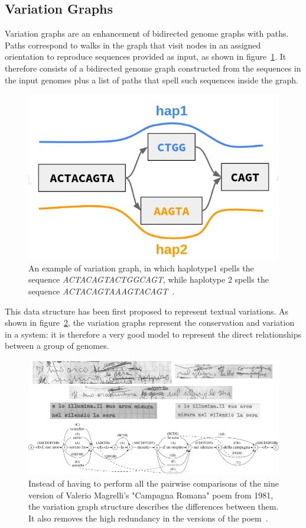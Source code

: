 \subsection{Variation Graphs}
Variation graphs are an enhancement of bidirected genome graphs with paths. Paths correspond to walks in the graph that visit nodes in an assigned orientation to reproduce sequences provided as input, as shown in figure~\ref{fig:vg_example}. It therefore consists of a bidirected genome graph constructed from the sequences in the input genomes plus a list of paths that spell such sequences inside the graph.
\begin{figure}[h!]
	\centering
	\includegraphics[width=.65\linewidth]{figures/background/vg.png}
	\caption[The Variation Graph model.]{An example of variation graph, in which haplotype1 spells the sequence \emph{ACTACAGTACTGGCAGT}, while haplotype 2 spells the sequence \emph{ACTACAGTAAAGTACAGT}~\cite{garrison_pangenome}.}
	\label{fig:vg_example}
\end{figure}
This data structure has been first proposed to represent textual variations. As shown in figure~\ref{fig:campagna_romana}, the variation graphs represent the conservation and variation in a system: it is therefore a very good model to represent the direct relationships between a group of genomes.
\begin{figure}[h!]
	\centering
	\includegraphics[width=.95\linewidth]{figures/background/variant_graph.jpg}
	\caption[The Variation Graph origin.]{Instead of having to perform all the pairwise comparisons of the nine version of Valerio Magrelli's "Campagna Romana" poem from 1981, the variation graph structure describes the differences between them. It also removes the high redundancy in the versions of the poem~\cite{variant_graph,garrison_pangenome}.}
	\label{fig:campagna_romana}
\end{figure}
